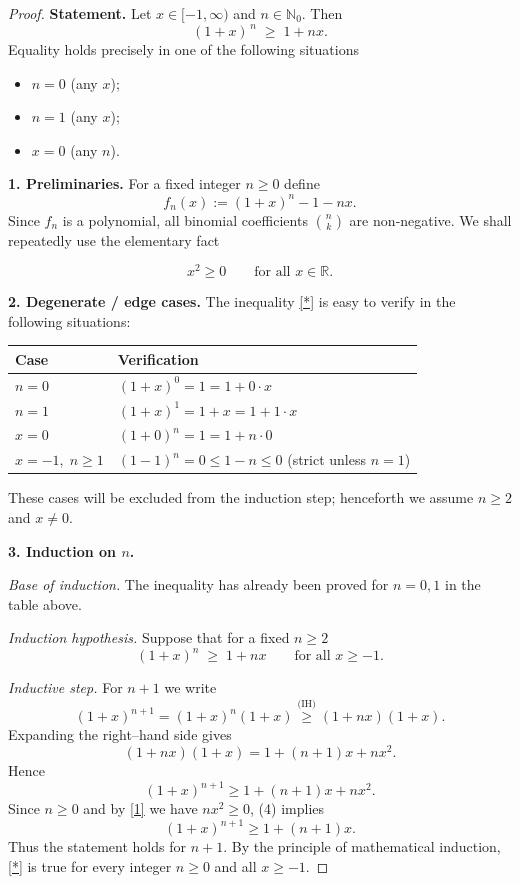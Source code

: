 \begin{proof}
\textbf{Statement.}  Let $x\in[-1,\infty)$ and $n\in\mathbb N_{0}$.
Then
\[
(1+x)^{\,n}\;\ge\;1+nx .
\tag{*}
\]
Equality holds precisely in one of the following situations  

\begin{itemize}
\item $n=0$ (any $x$);
\item $n=1$ (any $x$);
\item $x=0$ (any $n$).
\end{itemize}

\medskip

\textbf{1. Preliminaries.}  For a fixed integer $n\ge0$ define  
\[
f_{n}(x):=(1+x)^{n}-1-nx .
\]
Since $f_{n}$ is a polynomial, all binomial coefficients $\binom{n}{k}$ are non‑negative.  We shall repeatedly use the elementary fact  

\begin{equation}
x^{2}\ge0\qquad\text{for all }x\in\mathbb R .
\tag{1}
\end{equation}

\medskip

\textbf{2. Degenerate / edge cases.}  The inequality \eqref{*} is easy to verify in the following situations:

\begin{center}
\begin{tabular}{>{\bfseries}l l}
\textbf{Case} & \textbf{Verification}\\
\hline
$n=0$ & $(1+x)^{0}=1=1+0\cdot x$\\[2pt]
$n=1$ & $(1+x)^{1}=1+x=1+1\cdot x$\\[2pt]
$x=0$ & $(1+0)^{n}=1=1+n\cdot0$\\[2pt]
$x=-1,\;n\ge1$ & $(1-1)^{n}=0\le1-n\le0$ (strict unless $n=1$)
\end{tabular}
\end{center}
These cases will be excluded from the induction step; henceforth we assume $n\ge2$ and $x\neq0$.

\medskip

\textbf{3. Induction on $n$.}

\medskip
\noindent\textit{Base of induction.}  The inequality has already been proved for $n=0,1$ in the table above.

\medskip
\noindent\textit{Induction hypothesis.}  Suppose that for a fixed $n\ge2$
\[
(1+x)^{n}\;\ge\;1+nx\qquad\text{for all }x\ge-1 .
\tag{IH}
\]

\medskip
\noindent\textit{Inductive step.}  For $n+1$ we write
\[
(1+x)^{n+1}=(1+x)^{n}(1+x)
\overset{\text{(IH)}}{\ge}(1+nx)(1+x) .
\tag{2}
\]
Expanding the right–hand side gives
\[
(1+nx)(1+x)=1+(n+1)x+nx^{2} .
\tag{3}
\]
Hence
\[
(1+x)^{n+1}\ge 1+(n+1)x+nx^{2} .
\tag{4}
\]
Since $n\ge0$ and by \eqref{1} we have $nx^{2}\ge0$, (4) implies
\[
(1+x)^{n+1}\ge 1+(n+1)x .
\tag{5}
\]
Thus the statement holds for $n+1$.  By the principle of mathematical induction, \eqref{*} is true for every integer $n\ge0$ and all $x\ge-1$.


\end{proof}
